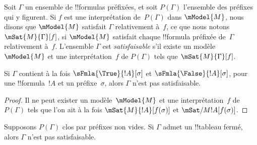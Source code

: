 \documentclass[../../../include/open-logic-section]{subfiles}
\begin{document}
\begin{defn}
  Soit $\Gamma$ un ensemble de !!{formula}s préfixées, et soit $P(\Gamma)$
  l'ensemble des préfixes qui y figurent. Si $f$ est une interprétation
  de~$P(\Gamma)$ dans $\mModel{M}$, nous disons que $\mModel{M}$ satisfait
  $\Gamma$ relativement à~$f$, ce que nous notons $\mSat{M}{\Gamma}[f]$,
  si $\mModel{M}$ satisfait chaque !!{formula} préfixée de~$\Gamma$
  relativement à~$f$. L'ensemble $\Gamma$ est \emph{satisfaisable} s'il
  existe un modèle~$\mModel{M}$ et une interprétation~$f$ de
  $P(\Gamma)$ tels que $\mSat{M}{\Gamma}[f]$.
\end{defn}

\begin{prop}
  Si $\Gamma$ contient à la fois $\sFmla{\True}{!A}[\sigma]$ et
  $\sFmla{\False}{!A}[\sigma]$, pour une !!{formula}~$!A$ et un
  préfixe~$\sigma$, alors $\Gamma$ n'est pas satisfaisable.
\end{prop}

\begin{proof}
  Il ne peut exister un modèle~$\mModel{M}$ et une interprétation~$f$ de
  $P(\Gamma)$ tels que l'on ait à la fois $\mSat{M}{!A}[f(\sigma)]$ et
  $\mSat/{M}{!A}[f(\sigma)]$.
\end{proof}

\begin{thm}[Correction]
  Supposons $P(\Gamma)$ clos par préfixes non vides. Si $\Gamma$ admet un !!{tableau} fermé,
  alors $\Gamma$ n'est pas satisfaisable.
\end{thm}
\end{document}

